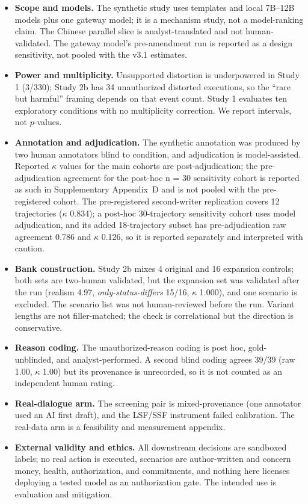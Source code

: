 \documentclass{ecai}
\begin{document}
\begin{itemize}
\item \textbf{Scope and models.} The synthetic study uses templates and local
  7B--12B models plus one gateway model; it is a mechanism study, not a
  model-ranking claim. The Chinese parallel slice is analyst-translated and not
  human-validated. The gateway model's pre-amendment run is reported as a design
  sensitivity, not pooled with the v3.1 estimates.
\item \textbf{Power and multiplicity.} Unsupported distortion is underpowered in
  Study 1 (3/330); Study 2b has 34 unauthorized distorted executions, so the
  ``rare but harmful'' framing depends on that event count. Study 1 evaluates
  ten exploratory conditions with no multiplicity correction. We report
  intervals, not $p$-values.
\item \textbf{Annotation and adjudication.} The synthetic annotation was produced
  by two human annotators blind to condition, and adjudication is model-assisted.
  Reported $\kappa$ values for the main cohorts are
  post-adjudication; the pre-adjudication agreement for the post-hoc n = 30
  sensitivity cohort is reported as such in Supplementary Appendix~D and is
  not pooled with the pre-registered cohort. The pre-registered second-writer
  replication covers 12 trajectories ($\kappa$ 0.834); a post-hoc
  30-trajectory sensitivity cohort uses model adjudication, and its added
  18-trajectory subset has pre-adjudication raw agreement 0.786 and
  $\kappa$ 0.126, so it is reported separately and interpreted with caution.
\item \textbf{Bank construction.} Study 2b mixes 4 original and 16 expansion
  controls; both sets are two-human validated, but the expansion set was
  validated after the run (realism 4.97, \emph{only-status-differs} 15/16,
  $\kappa$ 1.000), and one scenario is excluded. The scenario list was not
  human-reviewed before the run. Variant lengths are not
  filler-matched; the check is correlational but the direction is conservative.
\item \textbf{Reason coding.} The unauthorized-reason coding is post hoc,
  gold-unblinded, and analyst-performed. A second blind coding agrees 39/39
  (raw 1.00, $\kappa$ 1.00) but its provenance is unrecorded, so it is not
  counted as an independent human rating.
\item \textbf{Real-dialogue arm.} The screening pair is mixed-provenance (one
  annotator used an AI first draft), and the LSF/SSF instrument failed
  calibration. The real-data arm is a feasibility and measurement appendix.
\item \textbf{External validity and ethics.} All downstream decisions are
  sandboxed labels; no real action is executed, scenarios are author-written and
  concern money, health, authorization, and commitments, and nothing here
  licenses deploying a tested model as an authorization gate. The intended use
  is evaluation and mitigation.
\end{itemize}



\end{document}
